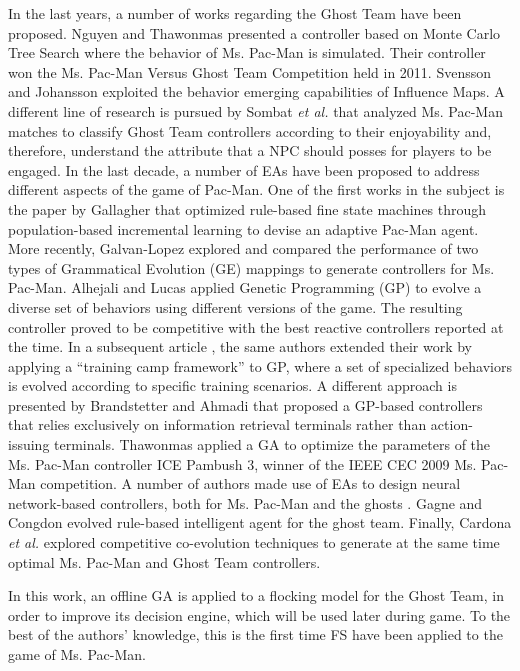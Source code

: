 \documentclass[a4paper]{llncs}
\begin{document}
In the last years, a number of works regarding the Ghost Team have been proposed. Nguyen and Thawonmas \cite{Nguyen2011,Nguyen2013} presented a controller based on Monte Carlo Tree Search where the behavior of Ms. Pac-Man is simulated. Their controller won the Ms. Pac-Man Versus Ghost Team Competition held in 2011. Svensson and Johansson \cite{Svensson2012} exploited the behavior emerging capabilities of Influence Maps. A different line of research is pursued by Sombat \textit{et al.} \cite{Sombat2012} that analyzed Ms. Pac-Man matches to classify Ghost Team controllers according to their enjoyability and, therefore, understand the attribute that a NPC should posses for players to be engaged. 
In the last decade, a number of EAs have been proposed to address different aspects of the game of Pac-Man. One of the first works in the subject is the paper by Gallagher \cite{Gallagher03} that optimized rule-based fine state machines through population-based incremental learning to devise an adaptive Pac-Man agent. More recently, Galvan-Lopez \cite{Galvan-Lopez10} explored and compared the performance of two types of Grammatical Evolution (GE) mappings to generate controllers for Ms. Pac-Man. Alhejali and Lucas \cite{Alhejali10} applied Genetic Programming (GP) to evolve a diverse set of behaviors using different versions of the game. The resulting controller proved to be competitive with the best reactive controllers reported at the time. In a subsequent article \cite{AlhejaliLucas11}, the same authors extended their work by applying a ``training camp framework'' to GP, where a set of specialized behaviors is evolved according to specific training scenarios. A different approach is presented by Brandstetter and Ahmadi \cite{Brandstetter12} that proposed a GP-based controllers that relies exclusively on information retrieval terminals rather than action-issuing terminals.  Thawonmas \cite{Thawonmas10} applied a GA to optimize the parameters of the Ms. Pac-Man controller ICE Pambush 3, winner of the IEEE CEC 2009 Ms. Pac-Man competition. A number of authors made use of EAs to design neural network-based controllers, both for Ms. Pac-Man \cite{Lucas05,Burrow09} and the ghosts \cite{Jia-Yue11}. Gagne and Congdon \cite{Gagne2012} evolved rule-based intelligent agent for the ghost team. Finally, Cardona \textit{et al.} \cite{Cardona13} explored competitive co-evolution techniques to generate at the same time optimal Ms. Pac-Man and Ghost Team controllers.

In this work, an offline GA is applied to a flocking model for the Ghost Team, in order to improve its decision engine, which will be used later during game. To the best of the authors' knowledge, this is the first time FS have been applied to the game of Ms. Pac-Man.
\end{document}
